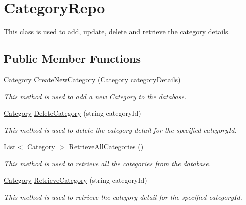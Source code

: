 \hypertarget{classWildLifeTracker_1_1Repository_1_1CategoryRepo}{}\section{Category\+Repo}
\label{classWildLifeTracker_1_1Repository_1_1CategoryRepo}


This class is used to add, update, delete and retrieve the category details.  


\subsection*{Public Member Functions}
\begin{DoxyCompactItemize}
\item 
\hyperlink{classWildLifeTracker_1_1Models_1_1Category}{Category} \hyperlink{classWildLifeTracker_1_1Repository_1_1CategoryRepo_ab195173edde734bea14de63331b50f2d}{Create\+New\+Category} (\hyperlink{classWildLifeTracker_1_1Models_1_1Category}{Category} category\+Details)
\begin{DoxyCompactList}\small\item\em This method is used to add a new Category to the database. \end{DoxyCompactList}\item 
\hyperlink{classWildLifeTracker_1_1Models_1_1Category}{Category} \hyperlink{classWildLifeTracker_1_1Repository_1_1CategoryRepo_a3dcd00ae5abcdcd32e325a71afb7cb48}{Delete\+Category} (string category\+Id)
\begin{DoxyCompactList}\small\item\em This method is used to delete the category detail for the specified category\+Id. \end{DoxyCompactList}\item 
List$<$ \hyperlink{classWildLifeTracker_1_1Models_1_1Category}{Category} $>$ \hyperlink{classWildLifeTracker_1_1Repository_1_1CategoryRepo_a486d29077bf5fc9b502cbabe2977e631}{Retrieve\+All\+Categories} ()
\begin{DoxyCompactList}\small\item\em This method is used to retrieve all the categories from the database. \end{DoxyCompactList}\item 
\hyperlink{classWildLifeTracker_1_1Models_1_1Category}{Category} \hyperlink{classWildLifeTracker_1_1Repository_1_1CategoryRepo_ac779b62775c23530db1e9e7a497e006b}{Retrieve\+Category} (string category\+Id)
\begin{DoxyCompactList}\small\item\em This method is used to retrieve the category detail for the specified category\+Id. \end{DoxyCompactList}\item 

\end{DoxyCompactItemize}
